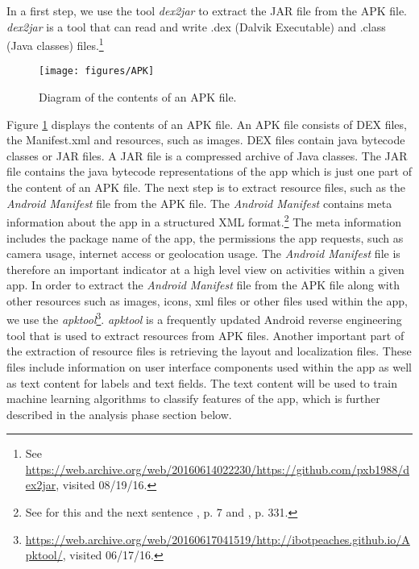 In a first step, we use the tool \textit{dex2jar} to extract the \acs{JAR} file from the APK file.
\textit{dex2jar} is a tool that can read and write .dex (Dalvik Executable) and .class (Java classes) files.\footnote{\raggedright See \url{https://web.archive.org/web/20160614022230/https://github.com/pxb1988/dex2jar}, visited 08/19/16.}

\begin{figure}[h]
	\centering
	\texttt{[image: figures/APK]}
	\caption{Diagram of the contents of an APK file.}
	\label{fig:apkFile}
\end{figure}

Figure \ref{fig:apkFile} displays the contents of an APK file. 
An APK file consists of DEX files, the Manifest.xml and resources, such as images.
DEX files contain java bytecode classes or JAR files.
A JAR file is a compressed archive of Java classes.
The JAR file contains the java bytecode representations of the app which is just one part of the content of an \acs{APK} file.
The next step is to extract resource files, such as the \textit{Android Manifest} file from the APK file.
The \textit{Android Manifest} contains meta information about the app in a structured XML format.\footnote{See for this and the next sentence \cite{xu2013}, p. 7 and \cite{Shabtai2010}, p. 331.}
The meta information includes the package name of the app, the permissions the app requests, such as camera usage, internet access or geolocation usage.
The \textit{Android Manifest} file is therefore an important indicator at a high level view on activities within a given app.
In order to extract the \textit{Android Manifest} file from the APK file along with other resources such as images, icons, xml files or other files used within the app, we use the \textit{apktool}\footnote{\url{https://web.archive.org/web/20160617041519/http://ibotpeaches.github.io/Apktool/}, visited 06/17/16.}.
\textit{apktool} is a frequently updated Android reverse engineering tool that is used to extract resources from APK files.
Another important part of the extraction of resource files is retrieving the layout and localization files.
These files include information on user interface components used within the app as well as text content for labels and text fields.
The text content will be used to train machine learning algorithms to classify features of the app, which is further described in the analysis phase section below.

